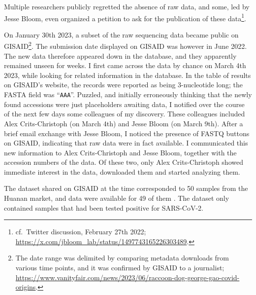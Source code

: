 \documentclass[11pt]{article}
\def \sct {\mbox{SARS-CoV-2}}
\begin{document}
Multiple researchers publicly regretted the absence of raw data, and some, led by Jesse Bloom, even organized a petition to ask for the publication of these data\footnote{cf.\ Twitter discussion, February 27th 2022; \url{https://x.com/jbloom_lab/status/1497743165226303489}.}.

On January 30th 2023, a subset of the raw sequencing data became public on GISAID\footnote{The date range was delimited by comparing metadata downloads from various time points, and it was confirmed by GISAID to a journalist; \url{https://www.vanityfair.com/news/2023/06/raccoon-dog-george-gao-covid-origins}.}. The submission date displayed on GISAID was however in June 2022. The new data therefore appeared down in the database, and they apparently remained unseen for weeks. I first came across the data by chance on March 4th 2023, while looking for related information in the database. In the table of results on GISAID's website, the records were reported as being 3-nucleotide long; the FASTA field was “\texttt{AAA}”. Puzzled, and initially erroneously thinking that the newly found accessions were just placeholders awaiting data, I notified over the course of the next few days some colleagues of my discovery. These colleagues included Alex Crits-Christoph (on March 4th) and Jesse Bloom (on March 9th). After a brief email exchange with Jesse Bloom, I noticed the presence of FASTQ buttons on GISAID, indicating that raw data were in fact available. I communicated this new information to Alex Crits-Christoph and Jesse Bloom, together with the accession numbers of the data. Of these two, only Alex Crits-Christoph showed immediate interest in the data, downloaded them and started analyzing them. 

The dataset shared on GISAID at the time corresponded to 50 samples from the Huanan market, and data were available for 49 of them \citep{ACC2023Zenodo}. The dataset only contained samples that had been tested positive for \sct{}. 
\end{document}
